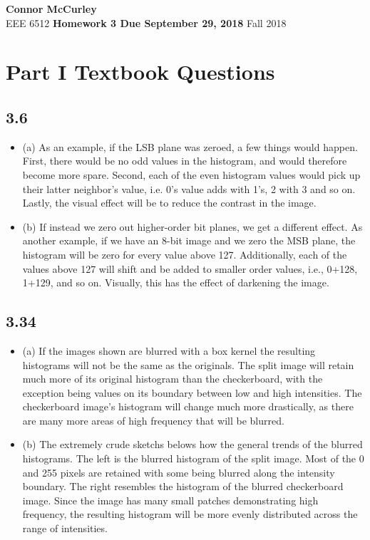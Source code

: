 \documentclass{article}[12 pt]
\begin{document}
	
\begin{center}
	\textbf{\Large Connor McCurley} \\
	EEE 6512 \qquad \textbf{\large Homework 3 Due September 29, 2018} \qquad Fall 2018 
\end{center}

\section*{Part I Textbook Questions}

\subsection*{3.6}
\begin{itemize}
\item (a) As an example, if the LSB plane was zeroed, a few things would happen.  First, there would be no odd values in the histogram, and would therefore become more spare.  Second, each of the even histogram values would pick up their latter neighbor's value, i.e. 0's value adds with 1's, 2 with 3 and so on.  Lastly, the visual effect will be to reduce the contrast in the image.

\item (b) If instead we zero out higher-order bit planes, we get a different effect.  As another example, if we have an 8-bit image and we zero the MSB plane, the histogram will be zero for every value above 127.  Additionally, each of the values above 127 will shift and be added to smaller order values, i.e., 0+128, 1+129, and so on.  Visually, this has the effect of darkening the image.
\end{itemize}


\subsection*{3.34}

\begin{itemize}
\item (a) If the images shown are blurred with a box kernel the resulting histograms will not be the same as the originals.  The split image will retain much more of its original histogram than the checkerboard, with the exception being values on its boundary between low and high intensities.  The checkerboard image's histogram will change much more drastically, as there are many more areas of high frequency that will be blurred.  

\item (b) The extremely crude sketchs belows how the general trends of the blurred histograms. The left is the blurred histogram of the split image.  Most of the 0 and 255 pixels are retained with some being blurred along the intensity boundary.  The right resembles the histogram of the blurred checkerboard image.  Since the image has many small patches demonstrating high frequency, the resulting histogram will be more evenly distributed across the range of intensities. 
\end{itemize}
\end{document}
